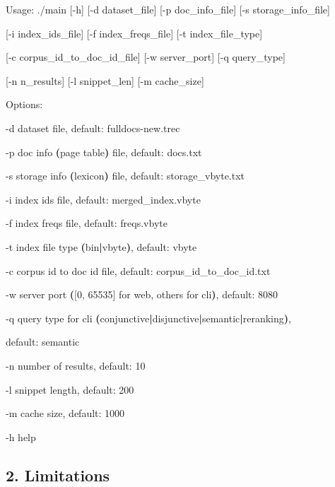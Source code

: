 \documentclass[11pt]{article}
\newenvironment{Shaded}{}{}
\newcommand{\ErrorTok}[1]{\textcolor[rgb]{1.00,0.00,0.00}{\textbf{#1}}}
\newcommand{\ExtensionTok}[1]{#1}
\newcommand{\FunctionTok}[1]{\textcolor[rgb]{0.02,0.16,0.49}{#1}}
\newcommand{\KeywordTok}[1]{\textcolor[rgb]{0.00,0.44,0.13}{\textbf{#1}}}
\newcommand{\NormalTok}[1]{#1}
\begin{document}
\begin{Shaded}
\begin{Highlighting}[]
\ExtensionTok{Usage:}\NormalTok{ ./main [{-}h] [{-}d dataset\_file] [{-}p doc\_info\_file] [{-}s storage\_info\_file]
}
    \ExtensionTok{[{-}i}\NormalTok{ index\_ids\_file] [{-}f index\_freqs\_file] [{-}t index\_file\_type]
}
    \ExtensionTok{[{-}c}\NormalTok{ corpus\_id\_to\_doc\_id\_file] [{-}w server\_port] [{-}q query\_type]
}
    \ExtensionTok{[{-}n}\NormalTok{ n\_results] [{-}l snippet\_len] [{-}m cache\_size]
}
\ExtensionTok{Options:
}
    \ExtensionTok{{-}d}\NormalTok{      dataset file, default: fulldocs{-}new.trec
}
    \ExtensionTok{{-}p}\NormalTok{      doc info }\ErrorTok{(}\ExtensionTok{page}\NormalTok{ table}\KeywordTok{)} \FunctionTok{file}\NormalTok{, default: docs.txt
}
    \ExtensionTok{{-}s}\NormalTok{      storage info }\ErrorTok{(}\ExtensionTok{lexicon}\KeywordTok{)} \FunctionTok{file}\NormalTok{, default: storage\_vbyte.txt
}
    \ExtensionTok{{-}i}\NormalTok{      index ids file, default: merged\_index.vbyte
}
    \ExtensionTok{{-}f}\NormalTok{      index freqs file, default: freqs.vbyte
}
    \ExtensionTok{{-}t}\NormalTok{      index file type }\ErrorTok{(}\ExtensionTok{bin}\KeywordTok{|}\ExtensionTok{vbyte}\KeywordTok{)}\ExtensionTok{,}\NormalTok{ default: vbyte
}
    \ExtensionTok{{-}c}\NormalTok{      corpus id to doc id file, default: corpus\_id\_to\_doc\_id.txt
}
    \ExtensionTok{{-}w}\NormalTok{      server port }\ErrorTok{(}\ExtensionTok{[0,}\NormalTok{ 65535] for web, others for cli}\KeywordTok{)}\ExtensionTok{,}\NormalTok{ default: 8080
}
    \ExtensionTok{{-}q}\NormalTok{      query type for cli }\ErrorTok{(}\ExtensionTok{conjunctive}\KeywordTok{|}\ExtensionTok{disjunctive}\KeywordTok{|}\ExtensionTok{semantic}\KeywordTok{|}\ExtensionTok{reranking}\KeywordTok{)}\ExtensionTok{,
}
            \ExtensionTok{default:}\NormalTok{ semantic
}
    \ExtensionTok{{-}n}\NormalTok{      number of results, default: 10
}
    \ExtensionTok{{-}l}\NormalTok{      snippet length, default: 200
}
    \ExtensionTok{{-}m}\NormalTok{      cache size, default: 1000
}
    \ExtensionTok{{-}h}\NormalTok{      help}
\end{Highlighting}
\end{Shaded}
        
\hypertarget{2-limitations}{%
\subsection{2. Limitations}\label{2-limitations}}
\end{document}

